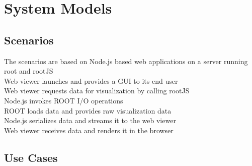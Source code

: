 \chapter{System Models}

\section{Scenarios}
The scenarios are based on Node.js based web applications on a server running root and rootJS\\

Web viewer launches and provides a GUI to its end user	\\
Web viewer requests data for visualization by calling rootJS\\
\indent	Node.js invokes ROOT I/O operations\\
\indent \indent		ROOT loads data and provides raw visualization data\\
\indent	Node.js serializes data and streams it to the web viewer\\
Web viewer receives data and renders it in the browser\\
\section{Use Cases}

\pagebreak[4]

